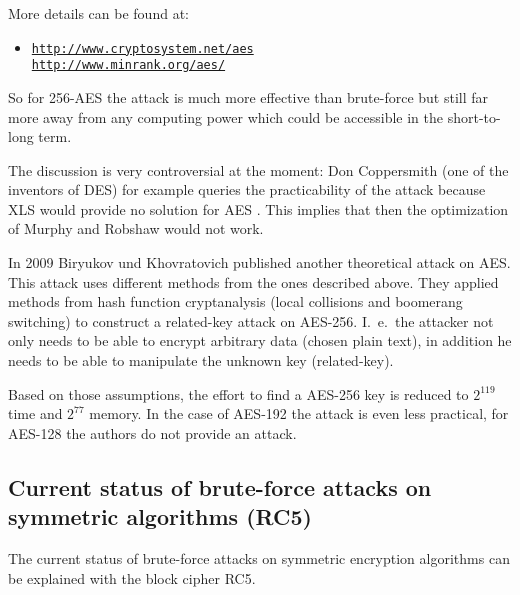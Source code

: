 More details can be found at:
\vspace{-10pt}
\begin{itemize}
  \item[] \href{http://www.cryptosystem.net/aes}
               {\texttt{http://www.cryptosystem.net/aes}}\\
          \href{http://www.minrank.org/aes/}
               {\texttt{http://www.minrank.org/aes/}}
\end{itemize}

So for 256-AES the attack is much more effective than brute-force but still far more away from any computing power which could be accessible in the short-to-long term. 

The discussion is very controversial at the moment: Don Coppersmith (one of the
inventors of DES) for example queries the practicability of the attack because
XLS would provide no solution for AES \cite{Coppersmith2002}. This implies that
then the optimization of Murphy and Robshaw \cite{Robshaw2002b} would not work.

In 2009 Biryukov und Khovratovich \cite{Biryukov2009} published another
theoretical attack on AES. This attack uses different methods from the ones
described above. They applied methods from hash function cryptanalysis (local
collisions and boomerang switching) to construct a related-key attack on
AES-256. I.~e.\ the attacker not only needs to be able to encrypt arbitrary data
(chosen plain text), in addition he needs to be able to manipulate the unknown key
(related-key). 

Based on those assumptions, the effort to find a AES-256 key is reduced to
$2^{119}$ time and $2^{77}$ memory. In the case of AES-192 the attack is even less
practical, for AES-128 the authors do not provide an attack.

\subsection{Current status of brute-force attacks on
symmetric algorithms (RC5)}
\label{Brute-force-gegen-Symmetr}

The current status of brute-force attacks on symmetric encryption algorithms can be explained with the block cipher RC5.

